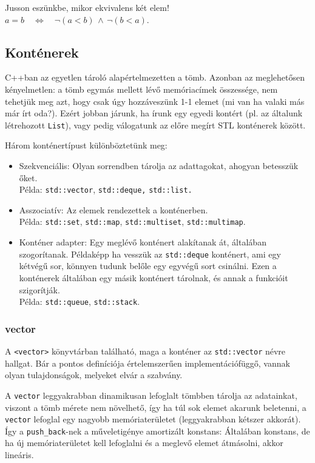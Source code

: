 \documentclass[a4paper,11.5pt]{article}
\begin{document}
	Jusson eszünkbe, mikor ekvivalens két elem! \quad $a = b \quad \Leftrightarrow \quad \neg(a<b)\, \wedge\, \neg(b<a)$.

	\subsection{Konténerek}
	C++ban az egyetlen tároló alapértelmezetten a tömb. Azonban az meglehetősen kényelmetlen: a tömb egymás mellett lévő memóriacímek összessége, nem tehetjük meg azt, hogy csak úgy hozzáveszünk 1-1 elemet (mi van ha valaki más már írt oda?). Ezért jobban járunk, ha írunk egy egyedi kontért (pl. az általunk létrehozott \texttt{List}), vagy pedig válogatunk az előre megírt STL konténerek között.
	
	Három konténertípust különböztetünk meg:
	\begin{itemize}
		\item Szekvenciális: Olyan sorrendben tárolja az adattagokat, ahogyan betesszük őket. \\Példa: \texttt{std::vector}, \texttt{std::deque,} \texttt{std::list.}
		\item Asszociatív: Az elemek rendezettek a konténerben.\\ Példa: \texttt{std::set}, \texttt{std::map}, \texttt{std::multiset}, \texttt{std::multimap}.
		\item Konténer adapter: Egy meglévő konténert alakítanak át, általában szogorítanak. Példaképp ha vesszük az \texttt{std::deque} konténert, ami egy kétvégű sor, könnyen tudunk belőle egy egyvégű sort csinálni. Ezen a konténerek általában egy másik konténert tárolnak, és annak a funkcióit szigorítják.
		\\Példa: \texttt{std::queue}, \texttt{std::stack}.
	\end{itemize}
	
	\subsubsection{vector}
	A \texttt{<vector>} könyvtárban található, maga a konténer az \texttt{std::vector} névre hallgat. Bár a pontos definíciója értelemszerűen implementációfüggő, vannak olyan tulajdonságok, melyeket elvár a szabvány.
	\smallskip
	
	A \texttt{vector} leggyakrabban dinamikusan lefoglalt tömbben tárolja az adatainkat, viszont a tömb mérete nem növelhető, így ha túl sok elemet akarunk beletenni, a \texttt{vector} lefoglal egy nagyobb memóriaterületet (leggyakrabban kétszer akkorát). Így a \texttt{push\_back}-nek a műveletigénye amortizált konstans: Általában konstans, de ha új memóriaterületet kell lefoglalni és a meglevő elemet átmásolni, akkor lineáris.
	
\end{document}
